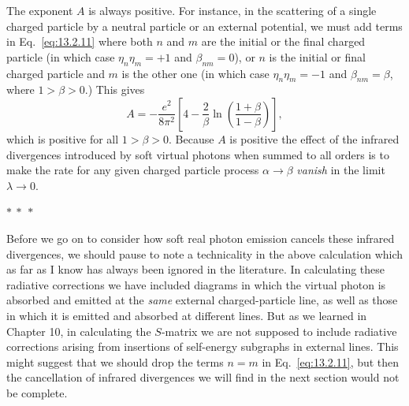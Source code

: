 The exponent $A$ is always positive. For instance, in the scattering of a
single charged particle by a neutral particle or an external potential, we
must add terms in Eq.~\eqref{eq:13.2.11} where both $n$ and $m$ are the initial or
the final charged particle (in which case $\eta_n\eta_m=+1$ and $\beta_{nm}=0$), or $n$ is
the initial or final charged particle and $m$ is the other one (in which case
$\eta_n\eta_m=-1$ and $\beta_{nm}=\beta$, where $1>\beta>0$.) This gives
\[
  A=-\frac{e^2}{8\pi^2}
  \left[4-\frac{2}{\beta}\ln\left(\frac{1+\beta}{1-\beta}\right)\right],
\]
which is positive for all $1>\beta>0$. Because $A$ is positive the effect of the
infrared divergences introduced by soft virtual photons when summed to
all orders is to make the rate for any given charged particle process $\alpha\to\beta$
\emph{vanish} in the limit $\lambda\to0$.

\begin{center}
$*\ *\ *$
\end{center}

Before we go on to consider how soft real photon emission cancels
these infrared divergences, we should pause to note a technicality in the
above calculation which as far as I know has always been ignored in
the literature. In calculating these radiative corrections we have included
diagrams in which the virtual photon is absorbed and emitted at the \emph{same}
external charged-particle line, as well as those in which it is emitted and
absorbed at different lines. But as we learned in Chapter 10, in calculating
the $S$-matrix we are not supposed to include radiative corrections arising
from insertions of self-energy subgraphs in external lines. This might
suggest that we should drop the terms $n=m$ in Eq.~\eqref{eq:13.2.11}, but then the
cancellation of infrared divergences we will find in the next section would
not be complete.

